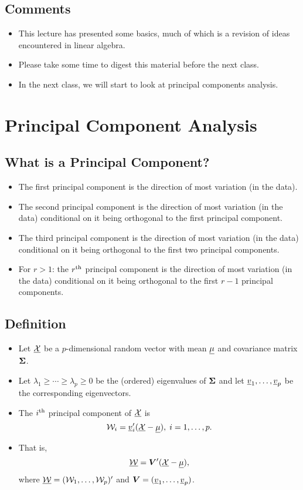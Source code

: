 \subsection*{Comments}
\begin{itemize}
      \item This lecture has presented some basics, much of which is a revision of ideas
            encountered in linear algebra.
      \item Please take some time to digest this material before the next class.
      \item In the next class, we will start to look at principal components analysis.
\end{itemize}
\section{Principal Component Analysis}
\subsection*{What is a Principal Component?}
\begin{itemize}
      \item The first principal component is the direction of most variation (in the
            data).
      \item The second principal component is the direction of most variation (in the
            data) conditional on it being orthogonal to the first principal component.
      \item The third principal component is the direction of most variation (in the
            data) conditional on it being orthogonal to the first two principal
            components.
      \item For $r > 1$: the $r\textsuperscript{th}$ principal component is the direction of most variation
            (in the data) conditional on it being orthogonal to the first $r-1$ principal
            components.
\end{itemize}
\subsection*{Definition}
\begin{itemize}
      \item Let $ \underline{\mathcal{X}} $ be a $ p $-dimensional random vector with mean $ \underline{\mu} $ and covariance matrix $ \bm{\Sigma} $.
      \item Let $ \lambda_1\ge \cdots \ge \lambda_p\ge 0 $ be the (ordered) eigenvalues of $ \bm{\Sigma} $ and let
            $ \underline{v}_1,\ldots,\underline{v}_p $ be the corresponding eigenvectors.
      \item The $ i\textsuperscript{th} $ principal component of $ \underline{\mathcal{X}} $ is
            \[ \mathcal{W}_i=\underline{v}_i'(\underline{\mathcal{X}}-\underline{\mu}),\; i=1,\ldots,p. \]
      \item That is,
            \[ \underline{\mathcal{W}}=\bm{V}'(\underline{\mathcal{X}}-\underline{\mu}), \]
            where $ \underline{\mathcal{W}}=(\mathcal{W}_1,\ldots,\mathcal{W}_p)' $ and $ \bm{V}=(\underline{v}_1,\ldots,\underline{v}_p) $.
\end{itemize}

